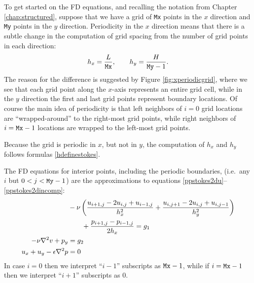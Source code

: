 To get started on the FD equations, and recalling the notation from Chapter \ref{chap:structured}, suppose that we have a grid of \texttt{Mx} points in the $x$ direction and \texttt{My} points in the $y$ direction.  Periodicity in the $x$ direction means that there is a subtle change in the computation of grid spacing from the number of grid points in each direction:
\begin{equation}
h_x = \frac{L}{\text{\texttt{Mx}}}, \qquad h_y = \frac{H}{\text{\texttt{My}}-1}. \label{hdefinestokes}
\end{equation}
The reason for the difference is suggested by Figure \ref{fig:xperiodicgrid}, where we see that each grid point along the $x$-axis represents an entire grid cell, while in the $y$ direction the first and last grid points represent boundary locations.  Of course the main idea of periodicity is that left neighbors of $i=0$ grid locations are ``wrapped-around'' to the right-most grid points, while right neighbors of $i=\text{\texttt{Mx}}-1$ locations are wrapped to the left-most grid points.

\begin{marginfigure}
\caption{Because the grid is periodic in $x$, but not in $y$, the computation of $h_x$ and $h_y$ follows formulas \eqref{hdefinestokes}.}
\label{fig:xperiodicgrid}
\end{marginfigure}

The FD equations for interior points, including the periodic boundaries, (i.e.~any $i$ but $0 < j < \text{\texttt{My}}-1$) are the approximations to equations \eqref{ppstokes2du}--\eqref{ppstokes2dincomp}:
\begin{align}
&-\nu \left(\frac{u_{i+1,j} - 2 u_{i,j} + u_{i-1,j}}{h_x^2} + \frac{u_{i,j+1} - 2 u_{i,j} + u_{i,j-1}}{h_y^2}\right) \notag \\
&\qquad + \frac{p_{i+1,j}-p_{i-1,j}}{2h_x} = g_1 \label{fdstokes2du} \\
-\nu \nabla^2 v + p_y &= g_2 \label{fdstokes2dv} \\
u_x + u_y - \epsilon \nabla^2 p &= 0 \label{fdstokes2dincomp}
\end{align}
In case $i=0$ then we interpret ``$i-1$'' subscripts as $\text{\texttt{Mx}}-1$, while if $i=\text{\texttt{Mx}}-1$ then we interpret ``$i+1$'' subscripts as $0$.

